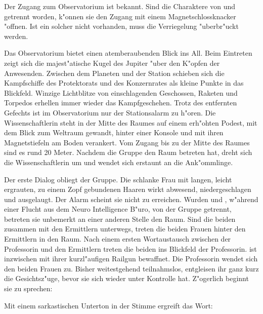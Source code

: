 
Der Zugang zum Observatorium ist \ml{} bekannt. Sind die Charaktere von \xl{} und \ml{} getrennt worden, k"onnen sie den Zugang mit einem Magnetschlossknacker "offnen. Ist ein solcher nicht vorhanden, muss die Verriegelung "uberbr"uckt werden.

Das Observatorium bietet einen atemberaubenden Blick ins All. Beim Eintreten zeigt sich die majest"atische Kugel des Jupiter "uber den K"opfen der Anwesenden. Zwischen dem Planeten und der Station schieben sich die Kampfschiffe des Protektorats und des Konzernrates als kleine Punkte in das Blickfeld. Winzige Lichtblitze von einschlagenden Geschossen, Raketen und Torpedos erhellen immer wieder das Kampfgeschehen. Trotz des entfernten Gefechts ist im Observatorium nur der Stationsalarm zu h"oren. Die Wissenschaftlerin steht in der Mitte des Raumes auf einem erh"ohten Podest, mit dem Blick zum Weltraum gewandt, hinter einer Konsole und mit ihren Magnetstiefeln am Boden verankert. Vom Zugang bis zu der Mitte des Raumes sind es rund 20 Meter. Nachdem die Gruppe den Raum betreten hat, dreht sich die Wissenschaftlerin um und wendet sich erstaunt an die Ank"ommlinge.


Der erste Dialog obliegt der Gruppe. Die schlanke Frau mit langen, leicht ergrauten, zu einem Zopf gebundenen Haaren wirkt abwesend, niedergeschlagen und ausgelaugt. Der Alarm scheint sie nicht zu erreichen. Wurden \xl{} und \ml{}, w"ahrend einer Flucht aus dem Neuro Intelligence B"uro, von der Gruppe getrennt, betreten sie unbemerkt an einer anderen Stelle den Raum. Sind die beiden zusammen mit den Ermittlern unterwegs, treten die beiden Frauen hinter den Ermittlern in den Raum. Nach einem ersten Wortaustausch zwischen der Professorin und den Ermittlern treten die beiden ins Blickfeld der Professorin. \xl{} ist inzwischen mit ihrer kurzl"aufigen Railgun bewaffnet. Die Professorin wendet sich den beiden Frauen zu. Bisher weitestgehend teilnahmslos, entgleisen ihr ganz kurz die Gesichtsz"uge, bevor sie sich wieder unter Kontrolle hat. Z"ogerlich beginnt sie zu sprechen:


Mit einem sarkastischen Unterton in der Stimme ergreift \xl{} das Wort:

